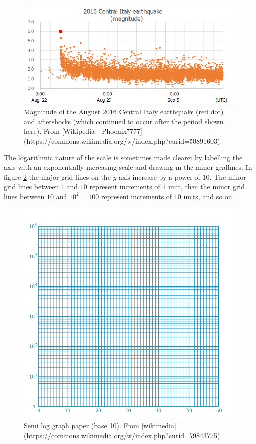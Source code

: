 \documentclass[
]{book}
\theoremstyle{definition}
\theoremstyle{definition}
\theoremstyle{definition}
\theoremstyle{definition}
\theoremstyle{remark}
\begin{document}
\begin{figure}
\includegraphics{figures/2016_Central_Italy_earthquake_(magnitude)} \caption{Magnitude of the August 2016 Central Italy earthquake (red dot) and aftershocks (which continued to occur after the period shown here). From [Wikipedia - Phoenix7777](https://commons.wikimedia.org/w/index.php?curid=50891603).}\label{fig:earthquake}
\end{figure}

The logarithmic nature of the scale is sometimes made clearer by labelling the axis with an exponentially increasing scale and drawing in the minor gridlines. In figure \ref{fig:semilog} the major grid lines on the \(y\)-axis increase by a power of \(10\). The minor grid lines between \(1\) and \(10\) represent increments of \(1\) unit, then the minor grid lines between \(10\) and \(10^2=100\) represent increments of \(10\) units, and so on.

\begin{figure}
\includegraphics{figures/Semilog_graph_paper} \caption{Semi log graph paper (base 10). From [wikimedia](https://commons.wikimedia.org/w/index.php?curid=79843775).}\label{fig:semilog}
\end{figure}
\end{document}
